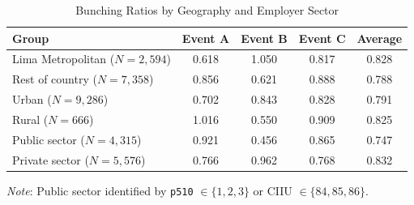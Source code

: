 \documentclass[12pt]{article}
\begin{document}
\begin{appendices}
\begin{table}[H]
\centering
\caption{Bunching Ratios by Geography and Employer Sector}
\label{tab:hetero_geo}
\begin{threeparttable}
\small
\begin{tabular}{lcccc}
\toprule
Group & Event A & Event B & Event C & Average \\
\midrule
Lima Metropolitan ($N = 2{,}594$) & 0.618 & 1.050 & 0.817 & 0.828 \\
Rest of country ($N = 7{,}358$) & 0.856 & 0.621 & 0.888 & 0.788 \\
Urban ($N = 9{,}286$) & 0.702 & 0.843 & 0.828 & 0.791 \\
Rural ($N = 666$) & 1.016 & 0.550 & 0.909 & 0.825 \\[4pt]
Public sector ($N = 4{,}315$) & 0.921 & 0.456 & 0.865 & 0.747 \\
Private sector ($N = 5{,}576$) & 0.766 & 0.962 & 0.768 & 0.832 \\
\bottomrule
\end{tabular}
\begin{tablenotes}
\small
\item \textit{Note}: Public sector identified by \texttt{p510} $\in \{1, 2, 3\}$ or CIIU $\in \{84, 85, 86\}$.
\end{tablenotes}
\end{threeparttable}
\end{table}

\end{appendices}
\end{document}
